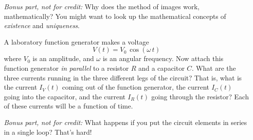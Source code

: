 \documentclass[12pt]{article}
\begin{document}
\textsl{Bonus part, not for credit:} Why does the method of images work,
mathematically? You might want to look up the mathematical concepts of
\emph{existence} and \emph{uniqueness}.

\startproblem%
A laboratory function generator makes a voltage
\begin{equation}
V(t) = V_0\,\cos(\omega\,t)
\end{equation}
where $V_0$ is an amplitude, and $\omega$ is an angular frequency. Now
attach this function generator \emph{in parallel} to a resistor $R$ and
a capacitor $C$. What are the three currents running in the three different
legs of the circuit? That is, what is the current $I_V(t)$ coming out of the function
generator, the current $I_C(t)$ going into the capacitor, and the current $I_R(t)$ going
through the resistor? Each of these currents will be a function of time.

\textsl{Bonus part, not for credit:} What happens if you put the circuit
elements in series in a single loop? That's hard!
\end{document}
